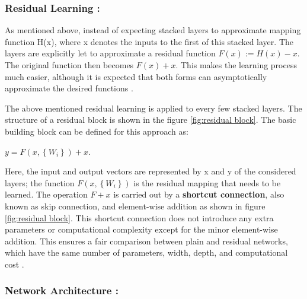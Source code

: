 \subsubsection*{Residual Learning :}

As mentioned above, instead of expecting stacked layers to approximate mapping function H(x), where x denotes the inputs to the first of this stacked layer. The layers are explicitly let to approximate a residual function $F(x) := H(x) - x$. The original function then becomes $F(x) + x$. This makes the learning process much easier, although it is expected that both forms can asymptotically approximate the desired functions \cite{he2016deep}.

The above mentioned residual learning is applied to every few stacked layers. The structure of a residual block is shown in the figure \ref{fig:residual block}. The basic building block can be defined for this approach as:

$ y = F(x, \left\{ W_{i}\right\}) + x$.

Here, the input and output vectors are represented by x and y of the considered layers; the function $F(x, \left\{ W_{i}\right\})$  is the residual mapping that needs to be learned. The operation $F + x$ is carried out by a \textbf{shortcut connection}, also known as skip connection, and element-wise addition as shown in figure \ref{fig:residual block}. This shortcut connection does not introduce any extra parameters or computational complexity except for the minor element-wise addition. This ensures a fair comparison between plain and residual networks, which have the same number of parameters, width, depth, and computational cost \cite{he2016deep}.

\subsubsection*{Network Architecture :}

